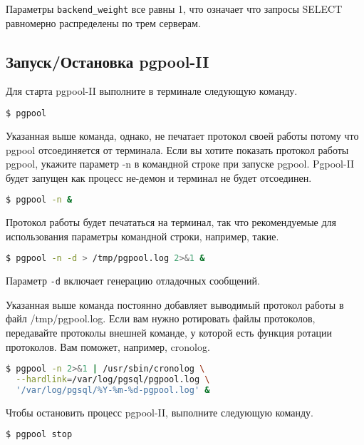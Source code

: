 Параметры \lstinline!backend_weight! все равны 1, что означает что запросы SELECT равномерно распределены по трем серверам.

\subsection{Запуск/Остановка pgpool-II}
\label{sec:pgpool-II-start-stop}

Для старта pgpool-II выполните в терминале следующую команду.

\begin{lstlisting}[language=Bash,label=lst:pgpool11,caption=Запуск]
$ pgpool
\end{lstlisting}

Указанная выше команда, однако, не печатает протокол своей работы потому что pgpool отсоединяется от терминала. Если вы хотите показать протокол работы pgpool, укажите параметр -n в командной строке при запуске pgpool. Pgpool-II будет запущен как процесс не-демон и терминал не будет отсоединен.

\begin{lstlisting}[language=Bash,label=lst:pgpool12,caption=Запуск]
$ pgpool -n &
\end{lstlisting}

Протокол работы будет печататься на терминал, так что рекомендуемые для использования параметры командной строки, например, такие.

\begin{lstlisting}[language=Bash,label=lst:pgpool13,caption=Запуск]
$ pgpool -n -d > /tmp/pgpool.log 2>&1 &
\end{lstlisting}

Параметр \lstinline!-d! включает генерацию отладочных сообщений.

Указанная выше команда постоянно добавляет выводимый протокол работы в файл /tmp/pgpool.log. Если вам нужно ротировать файлы протоколов, передавайте протоколы внешней команде, у которой есть функция ротации протоколов. Вам поможет, например, cronolog.

\begin{lstlisting}[language=Bash,label=lst:pgpool14,caption=Запуск]
$ pgpool -n 2>&1 | /usr/sbin/cronolog \
  --hardlink=/var/log/pgsql/pgpool.log \
  '/var/log/pgsql/%Y-%m-%d-pgpool.log' &
\end{lstlisting}

Чтобы остановить процесс pgpool-II, выполните следующую команду.

\begin{lstlisting}[language=Bash,label=lst:pgpool15,caption=Остановка]
$ pgpool stop
\end{lstlisting}

